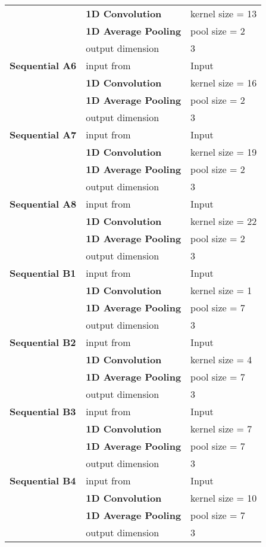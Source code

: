 \begin{tabularx}{\textwidth}[!h]{X X X}
	& \textbf{1D Convolution} & kernel size = 13\\
	& \textbf{1D Average Pooling} & pool size = 2\\
	& output dimension & 3\\
	[8pt]
	\textbf{Sequential A6} & input from & Input\\
	& \textbf{1D Convolution} & kernel size = 16\\
	& \textbf{1D Average Pooling} & pool size = 2\\
	& output dimension & 3\\
	[8pt]
	\textbf{Sequential A7} & input from & Input\\
	& \textbf{1D Convolution} & kernel size = 19\\
	& \textbf{1D Average Pooling} & pool size = 2\\
	& output dimension & 3\\
	[8pt]
	\textbf{Sequential A8} & input from & Input\\
	& \textbf{1D Convolution} & kernel size = 22\\
	& \textbf{1D Average Pooling} & pool size = 2\\
	& output dimension & 3\\
	[8pt]
	\textbf{Sequential B1} & input from & Input\\
	& \textbf{1D Convolution} & kernel size = 1\\
	& \textbf{1D Average Pooling} & pool size = 7\\
	& output dimension & 3\\
	[8pt]
	\textbf{Sequential B2} & input from & Input\\
	& \textbf{1D Convolution} & kernel size = 4\\
	& \textbf{1D Average Pooling} & pool size = 7\\
	& output dimension & 3\\
	[8pt]
	\textbf{Sequential B3} & input from & Input\\
	& \textbf{1D Convolution} & kernel size = 7\\
	& \textbf{1D Average Pooling} & pool size = 7\\
	& output dimension & 3\\
	[8pt]
	\textbf{Sequential B4} & input from & Input\\
	& \textbf{1D Convolution} & kernel size = 10\\
	& \textbf{1D Average Pooling} & pool size = 7\\
	& output dimension & 3\\
	[8pt]

\end{tabularx}
